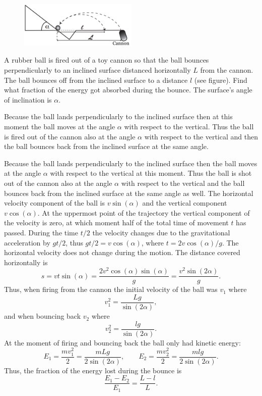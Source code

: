 \begin{figure}
  \vspace{-20pt}
  \begin{center}
    \includegraphics[width=0.5\textwidth]{2016-lahg-01-kaldjoonis_ing}
  \end{center}
  \vspace{-30pt}
\end{figure}
A rubber ball is fired out of a toy cannon so that the ball bounces perpendicularly to an inclined surface distanced horizontally $L$ from the cannon. The ball bounces off from the inclined surface to a distance $l$ (see figure). Find what fraction of the energy got absorbed during the bounce. The surface’s angle of inclination is $\alpha$.

\hinteng
Because the ball lands perpendicularly to the inclined surface then at this moment the ball moves at the angle $\alpha$ with respect to the vertical. Thus the ball is fired out of the cannon also at the angle $\alpha$ with respect to the vertical and then the ball bounces back from the inclined surface at the same angle.

\solueng
Because the ball lands perpendicularly to the inclined surface then the ball moves at the angle $\alpha$ with respect to the vertical at this moment. Thus the ball is shot out of the cannon also at the angle $\alpha$ with respect to the vertical and the ball bounces back from the inclined surface at the same angle as well. The horizontal velocity component of the ball is $v\sin(\alpha)$ and the vertical component $v\cos(\alpha)$. At the uppermost point of the trajectory the vertical component of the velocity is zero, at which moment half of the total time of movement $t$ has passed. During the time $t/2$ the velocity changes due to the gravitational acceleration by $gt/2$, thus $gt/2 =v\cos(\alpha)$, where $t=2v\cos(\alpha)/g$. The horizontal velocity does not change during the motion. The distance covered horizontally is
$$s=vt\sin(\alpha)=\frac{2v^2\cos(\alpha)\sin(\alpha)}{g} = \frac{v^2\sin(2\alpha)}{g}.$$ 
Thus, when firing from the cannon the initial velocity of the ball was $v_1$ where
\[ v_1^2 = \frac{Lg}{\sin(2\alpha)}, \] 
and when bouncing back $v_2$ where
\[ v_2^2 = \frac{lg}{\sin(2\alpha)}. \] 
At the moment of firing and bouncing back the ball only had kinetic energy:
\[ E_1 = \frac{mv_1^2}{2}=\frac{mLg}{2\sin(2\alpha)},\quad\quad E_2 =\frac{mv_2^2}{2} = \frac{mlg}{2\sin(2\alpha)}. \]
Thus, the fraction of the energy lost during the bounce is
\[ \frac{E_1-E_2}{E_1} = \frac{L-l}{L}. \]
\probend